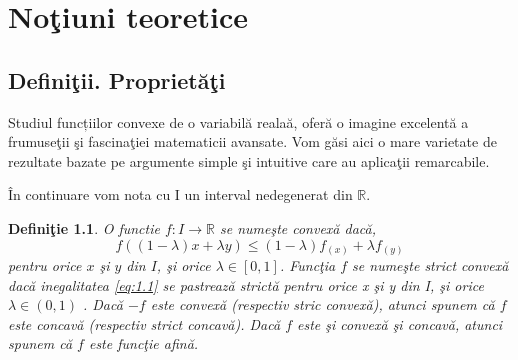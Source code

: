 \documentclass[a4paper,12pt,oneside]{report}
\newtheorem{definition}{Defini\c tie}
\begin{document}
\maketitle

\tableofcontents

%
%
%
%
\chapter{No\c{t}iuni teoretice}

\section{Defini\c{t}ii. Propriet\u{a}\c{t}i}

Studiul funcțiilor convexe de o variabil\u {a} reala\u {a}, ofer\u{a} o imagine excelent\u {a} a frumuse\c {t}ii \c{s}i fascina\c{t}iei matematicii avansate. Vom g\u{a}si aici o mare varietate de rezultate bazate pe argumente simple \c{s}i intuitive care au aplica\c{t}ii remarcabile.

\^{I}n continuare vom nota cu I un interval nedegenerat din \(\mathbb{R}\).

\begin{definition}

O functie \(f: I \rightarrow \mathbb{R}\) se nume\c{s}te convex\u{a} dac\u{a},
\begin{displaymath}
f \left ( \left ( 1 - \lambda  \right )x + \lambda y \right )\leq \left ( 1 - \lambda  \right ) f_{\left ( x \right )} + \lambda f_{\left ( y \right )} 	\label{eq:1.1} \tag{1.1}
\end{displaymath}
pentru orice \(x\) \c{s}i \(y\) din \(I\), \c{s}i orice \(\lambda \in \left [ 0,1 \right ]\). Func\c{t}ia \(f\) se nume\c{s}te strict convex\u{a} dac\u{a} inegalitatea \ref{eq:1.1} se pastreaz\u{a}  strict\u{a} pentru orice x \c{s}i y din I, \c{s}i orice  \(\lambda \in \left ( 0,1 \right )\) . Dac\u{a} \(-f\) este convex\u{a} (respectiv stric convex\u{a}), atunci spunem c\u{a} \(f\) este concav\u{a} (respectiv strict concav\u{a}). Dac\u{a} \(f\) este \c{s}i convex\u{a} \c{s}i concav\u{a}, atunci spunem c\u{a} \(f\) este func\c{t}ie afin\u{a}.
\end{definition}
\end{document}

